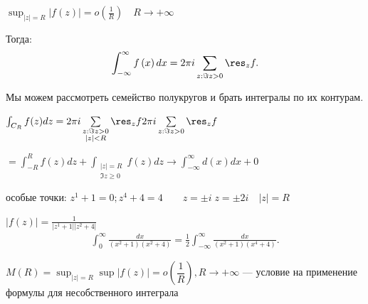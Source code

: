 \begin{enumerate}
    $\sup_{|z| = R} |f(z)| = o(\frac{1}{R})\quad R\to +\infty $

    Тогда:
    \[
        \int_{-\infty }^{\infty }f\left( x \right) dx = 2\pi i \sum_{z:\Im z >0}\res_z f
    .\]

    Мы можем рассмотреть семейство полукругов и брать интегралы по их контурам.

    $\int_{C_R}f(z)dz = 2\pi i \sum_{\substack{z:\Im z> 0\\ |z|< R}} \res_z f 2\pi i \sum_{z: \Im z > 0}\res_zf$

    $ = \int_{-R}^R f(z) dz + \int_{\substack{|z| = R\\ \Im z \geqslant 0}} f(z)dz \to \int_{-\infty }^{\infty }d(x)dx + 0$

    \begin{example}

        особые точки: $z^1 + 1=0;z^4 + 4 = 4\qquad z = \pm i\;z = \pm 2i\quad |z| = R$

        $|f(z)| = \frac{1}{|z^1 + 1| |z^2 + 4|}$
        \begin{align*}
            \int_0^{\infty } \frac{dx}{(x^2 + 1)(x^2 + 4)} = \frac{1}{2}\int_{-\infty }^{\infty } \frac{dx}{(x^2 + 1) (x^4 +4)}
        .\end{align*}
    \end{example}
\end{enumerate}

$M(R) = \sup_{|z| = R}\sup |f(z)| = o\left(\dfrac 1 R \right), R\to +\infty$ --- условие на применение формулы для несобственного интеграла

